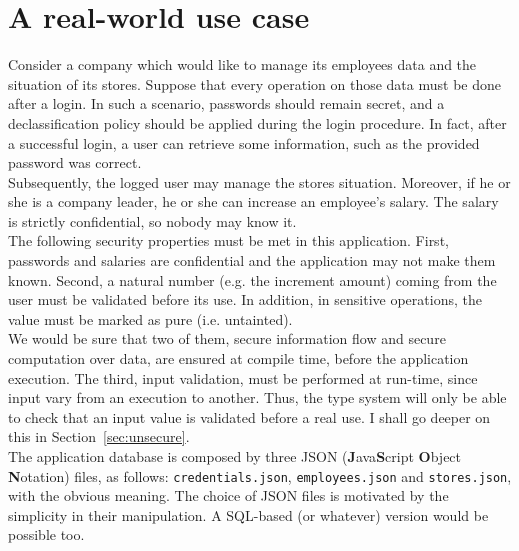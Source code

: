 \section{A real-world use case}\label{sec:example}
Consider a company which would like to manage its employees data and the situation of its stores. Suppose that every operation on those data must be done after a login. In such a scenario, passwords should remain secret, and a declassification policy should be applied during the login procedure. In fact, after a successful login, a user can retrieve some information, such as the provided password was correct. \\
Subsequently, the logged user may manage the stores situation. Moreover, if he or she is a company leader, he or she can increase an employee's salary. The salary is strictly confidential, so nobody may know it. \\
The following security properties must be met in this application. First, passwords and salaries are confidential and the application may not make them known. Second, a natural number (e.g. the increment amount) coming from the user must be validated before its use. In addition, in sensitive operations, the value must be marked as pure (i.e. untainted). \\
We would be sure that two of them, secure information flow and secure computation over data, are ensured at compile time, before the application execution. The third, input validation, must be performed at run-time, since input vary from an execution to another. Thus, the type system will only be able to check that an input value is validated before a real use. I shall go deeper on this in Section~\ref{sec:unsecure}. \\
The application database is composed by three JSON (\textbf{J}ava\textbf{S}cript \textbf{O}bject \textbf{N}otation) files, as follows: \texttt{credentials.json}, \texttt{employees.json} and \texttt{stores.json}, with the obvious meaning. The choice of JSON files is motivated by the simplicity in their manipulation. A SQL-based (or whatever) version would be possible too.
